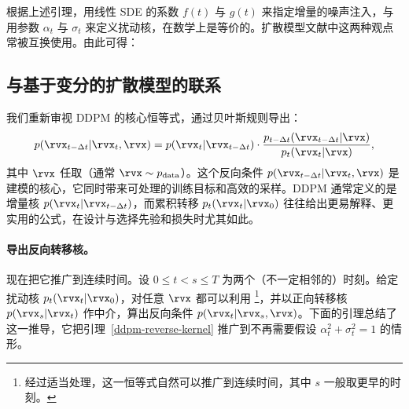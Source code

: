 

根据上述引理，用线性 SDE 的系数 $f(t)$ 与 $g(t)$ 来指定增量的噪声注入，与用参数 $\alpha_t$ 与 $\sigma_t$ 来定义扰动核，在数学上是等价的。扩散模型文献中这两种观点常被互换使用。由此可得：


\subsection{与基于变分的扩散模型的联系}\label{subsec:connection-vdm}
我们重新审视 DDPM 的核心恒等式，通过贝叶斯规则导出：
\begin{align}\label{eq:ddpm-reverse-condition-kernel}
    p(\rvx_{t-\Delta t}|\rvx_t, \rvx) = p(\rvx_t|\rvx_{t-\Delta t}) \cdot \frac{p_{t-\Delta t}(\rvx_{t-\Delta t}|\rvx)}{p_t(\rvx_t|\rvx)},
\end{align}
其中 $\rvx$ 任取（通常 $\rvx\sim p_{\mathrm{data}}$）。这个反向条件 $ p(\rvx_{t-\Delta t} | \rvx_t, \rvx) $ 是建模的核心，它同时带来可处理的训练目标和高效的采样。DDPM 通常定义的是增量核 $p(\rvx_t|\rvx_{t-\Delta t})$，而累积转移 $p_t(\rvx_t|\rvx_0)$ 往往给出更易解释、更实用的公式，在设计与选择先验和损失时尤其如此。

\paragraph{导出反向转移核。}
现在把它推广到连续时间。设 $0 \leq t < s \leq T$ 为两个（不一定相邻的）时刻。给定扰动核 $p_t(\rvx_t|\rvx_0)$，对任意 $\rvx$ 都可以利用 \footnote{经过适当处理，这一恒等式自然可以推广到连续时间，其中 $s$ 一般取更早的时刻。}，并以正向转移核 $p(\rvx_s|\rvx_t)$ 作中介，算出反向条件 $p(\rvx_t|\rvx_s, \rvx)$。下面的引理总结了这一推导，它把引理~\ref{ddpm-reverse-kernel} 推广到不再需要假设 $\alpha_t^2 + \sigma_t^2 = 1$ 的情形。

